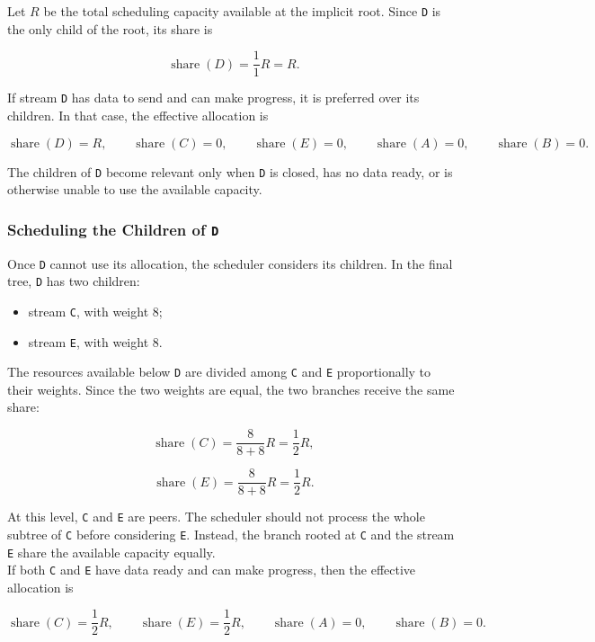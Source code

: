 \documentclass{scrbook}
\begin{document}
Let \(R\) be the total scheduling capacity available at the implicit root. Since \texttt{D} is the only child of the root, its share is

\[
\operatorname{share}(D)
=
\frac{1}{1}R
=
R.
\]

If stream \texttt{D} has data to send and can make progress, it is preferred over its children. In that case, the effective allocation is

\[
\operatorname{share}(D)=R,
\qquad
\operatorname{share}(C)=0,
\qquad
\operatorname{share}(E)=0,
\qquad
\operatorname{share}(A)=0,
\qquad
\operatorname{share}(B)=0.
\]

The children of \texttt{D} become relevant only when \texttt{D} is closed, has no data ready, or is otherwise unable to use the available capacity.

\subsubsection{Scheduling the Children of \texttt{D}}

Once \texttt{D} cannot use its allocation, the scheduler considers its children. In the final tree, \texttt{D} has two children:

\begin{itemize}
	\item stream \texttt{C}, with weight \(8\);
	\item stream \texttt{E}, with weight \(8\).
\end{itemize}

The resources available below \texttt{D} are divided among \texttt{C} and \texttt{E} proportionally to their weights. Since the two weights are equal, the two branches receive the same share:

\[
\operatorname{share}(C)
=
\frac{8}{8+8}R
=
\frac{1}{2}R,
\]

\[
\operatorname{share}(E)
=
\frac{8}{8+8}R
=
\frac{1}{2}R.
\]

At this level, \texttt{C} and \texttt{E} are peers. The scheduler should not process the whole subtree of \texttt{C} before considering \texttt{E}. Instead, the branch rooted at \texttt{C} and the stream \texttt{E} share the available capacity equally.\\

If both \texttt{C} and \texttt{E} have data ready and can make progress, then the effective allocation is

\[
\operatorname{share}(C)=\frac{1}{2}R,
\qquad
\operatorname{share}(E)=\frac{1}{2}R,
\qquad
\operatorname{share}(A)=0,
\qquad
\operatorname{share}(B)=0.
\]
\end{document}
